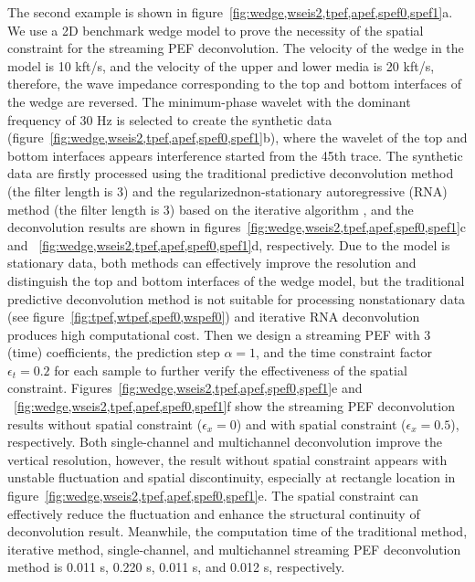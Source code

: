 The second example is shown in
figure~\ref{fig:wedge,wseis2,tpef,apef,spef0,spef1}a. We use a 2D
benchmark wedge model to prove the necessity of the spatial constraint
for the streaming PEF deconvolution. The velocity of the wedge in the
model is 10 kft/s, and the velocity of the upper and lower media is 20
kft/s, therefore, the wave impedance corresponding to the top and
bottom interfaces of the wedge are reversed. The minimum-phase wavelet
with the dominant frequency of 30 Hz is selected to create the
synthetic data (figure~\ref{fig:wedge,wseis2,tpef,apef,spef0,spef1}b),
where the wavelet of the top and bottom interfaces appears
interference started from the 45th trace. The synthetic data are
firstly processed using the traditional predictive deconvolution
method (the filter length is 3) and the regularizednon-stationary
autoregressive (RNA) method (the filter length is 3) based on the
iterative algorithm \cite[]{Liu11}, and the deconvolution results are
shown in figures~\ref{fig:wedge,wseis2,tpef,apef,spef0,spef1}c and
~\ref{fig:wedge,wseis2,tpef,apef,spef0,spef1}d, respectively. Due to
the model is stationary data, both methods can effectively improve the
resolution and distinguish the top and bottom interfaces of the wedge
model, but the traditional predictive deconvolution method is not
suitable for processing nonstationary data (see
figure~\ref{fig:tpef,wtpef,spef0,wspef0}) and iterative RNA
deconvolution produces high computational cost. Then we design a
streaming PEF with 3 (time) coefficients, the prediction step
$\alpha=1$, and the time constraint factor $\epsilon_t=0.2$ for each
sample to further verify the effectiveness of the spatial constraint.
Figures~\ref{fig:wedge,wseis2,tpef,apef,spef0,spef1}e and
~\ref{fig:wedge,wseis2,tpef,apef,spef0,spef1}f show the streaming PEF
deconvolution results without spatial constraint ($\epsilon_x=0$) and
with spatial constraint ($\epsilon_x=0.5$), respectively. Both
single-channel and multichannel deconvolution improve the vertical
resolution, however, the result without spatial constraint appears
with unstable fluctuation and spatial discontinuity, especially at
rectangle location in
figure~\ref{fig:wedge,wseis2,tpef,apef,spef0,spef1}e. The spatial
constraint can effectively reduce the fluctuation and enhance the
structural continuity of deconvolution result. Meanwhile, the
computation time of the traditional method, iterative method,
single-channel, and multichannel streaming PEF deconvolution method is
0.011 s, 0.220 s, 0.011 s, and 0.012 s, respectively.


